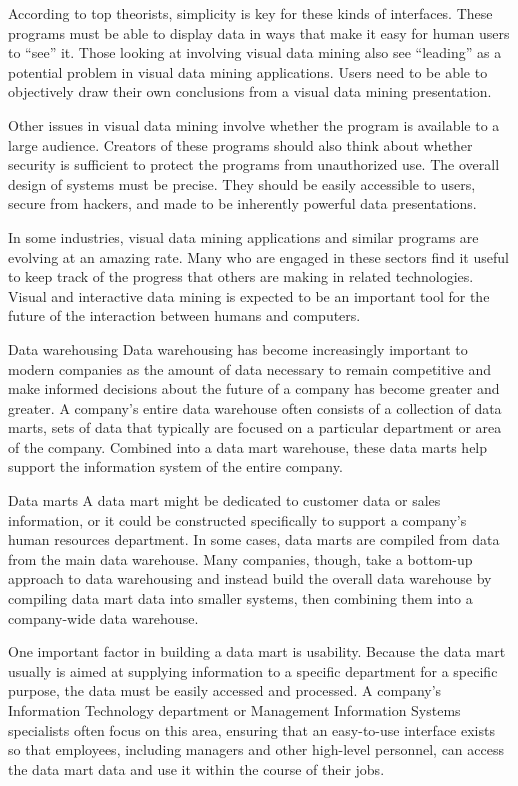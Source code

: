According to top theorists, simplicity is key for these kinds of interfaces. These programs must be able to display data in ways that make it easy for human users to “see” it. Those looking at involving visual data mining also see “leading” as a potential problem in visual data mining applications. Users need to be able to objectively draw their own conclusions from a visual data mining presentation.

Other issues in visual data mining involve whether the program is available to a large audience. Creators of these programs should also think about whether security is sufficient to protect the programs from unauthorized use. The overall design of systems must be precise. They should be easily accessible to users, secure from hackers, and made to be inherently powerful data presentations.

In some industries, visual data mining applications and similar programs are evolving at an amazing rate. Many who are engaged in these sectors find it useful to keep track of the progress that others are making in related technologies. Visual and interactive data mining is expected to be an important tool for the future of the interaction between humans and computers.


Data warehousing 
Data warehousing has become increasingly important to modern companies as the amount of data necessary to remain competitive and make informed decisions about the future of a company has become greater and greater. A company's entire data warehouse often consists of a collection of data marts, sets of data that typically are focused on a particular department or area of the company. Combined into a data mart warehouse, these data marts help support the information system of the entire company.

Data marts
A data mart might be dedicated to customer data or sales information, or it could be constructed specifically to support a company's human resources department. In some cases, data marts are compiled from data from the main data warehouse. Many companies, though, take a bottom-up approach to data warehousing and instead build the overall data warehouse by compiling data mart data into smaller systems, then combining them into a company-wide data warehouse.

One important factor in building a data mart is usability. Because the data mart usually is aimed at supplying information to a specific department for a specific purpose, the data must be easily accessed and processed. A company's Information Technology department or Management Information Systems specialists often focus on this area, ensuring that an easy-to-use interface exists so that employees, including managers and other high-level personnel, can access the data mart data and use it within the course of their jobs.

